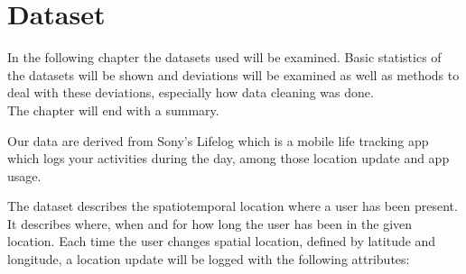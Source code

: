 \chapter{Dataset}
\label{chap:dataset}
In the following chapter the datasets used will be examined. Basic statistics of the datasets will be shown and deviations will be examined as well as methods to deal with these deviations, especially how data cleaning was done. \\
The chapter will end with a summary. 

Our data are derived from Sony's Lifelog\cite{sonyLifeLog} which is a mobile life tracking app which logs your activities during the day, among those location update and app usage. 

The dataset describes the spatiotemporal location where a user has been present. It describes where, when and for how long the user has been in the given location. Each time the user changes spatial location, defined by latitude and longitude, a location update will be logged with the following attributes: 


